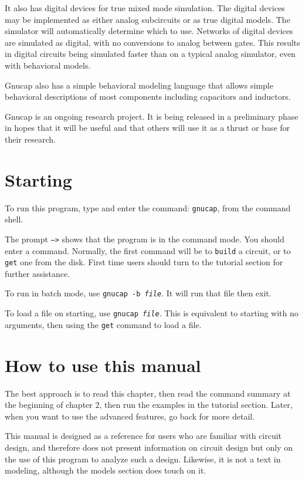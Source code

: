 It also has digital devices for true mixed mode simulation.  The digital
devices may be implemented as either analog subcircuits or as true digital
models.  The simulator will automatically determine which to use.  Networks
of digital devices are simulated as digital, with no conversions to analog
between gates.  This results in digital circuits being simulated faster than
on a typical analog simulator, even with behavioral models.

Gnucap also has a simple behavioral modeling language that allows simple
behavioral descriptions of most components including capacitors and
inductors.

Gnucap is an ongoing research project.  It is being released in a preliminary
phase in hopes that it will be useful and that others will use it as a
thrust or base for their research.
\section{Starting}

To run this program, type and enter the command: {\tt gnucap}, from
the command shell.

The prompt {\tt -->} shows that the program is in the command mode.  You
should enter a command.  Normally, the first command will be to {\tt build} a
circuit, or to {\tt get} one from the disk.  First time users should turn to
the tutorial section for further assistance. 

To run in batch mode, use {\tt gnucap -b {\em file}}.  It will run that
file then exit.

To load a file on starting, use {\tt gnucap {\em file}}.  This is
equivalent to starting with no arguments, then using the {\tt get}
command to load a file.
\section{How to use this manual}

The best approach is to read this chapter, then read the command summary at
the beginning of chapter 2, then run the examples in the tutorial section.
Later, when you want to use the advanced features, go back for more detail.

This manual is designed as a reference for users who are familiar with
circuit design, and therefore does not present information on circuit design
but only on the use of this program to analyze such a design.  Likewise, it
is not a text in modeling, although the models section does touch on it.

